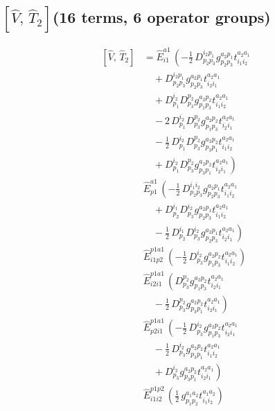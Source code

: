 \documentclass[11pt]{article}
\begin{document}
\subsection*{$\left[\hat{V},\, \hat{T}_{2}\right]$\quad(16 terms, 6 operator groups)}
\begin{align}
\left[\hat{V},\, \hat{T}_{2}\right] &= \hat{E}^{a1}_{i1}\,\left(- \tfrac{1}{2}\, D^{i_{2}p_{1}}_{p_{2}p_{3}} g^{a_{2}p_{1}}_{p_{2}p_{3}} t^{a_{2}a_{1}}_{i_{1}i_{2}} \right. \\
&\left.\quad + D^{i_{2}p_{1}}_{p_{2}p_{3}} g^{a_{2}p_{1}}_{p_{2}p_{3}} t^{a_{2}a_{1}}_{i_{2}i_{1}} \right. \\
&\left.\quad + D^{i_{2}}_{p_{1}} D^{p_{2}}_{p_{3}} g^{a_{2}p_{2}}_{p_{1}p_{3}} t^{a_{2}a_{1}}_{i_{1}i_{2}} \right. \\
&\left.\quad - 2\, D^{i_{2}}_{p_{1}} D^{p_{2}}_{p_{3}} g^{a_{2}p_{2}}_{p_{1}p_{3}} t^{a_{2}a_{1}}_{i_{2}i_{1}} \right. \\
&\left.\quad - \tfrac{1}{2}\, D^{i_{2}}_{p_{1}} D^{p_{2}}_{p_{3}} g^{a_{2}p_{2}}_{p_{3}p_{1}} t^{a_{2}a_{1}}_{i_{1}i_{2}} \right. \\
&\left.\quad + D^{i_{2}}_{p_{1}} D^{p_{2}}_{p_{3}} g^{a_{2}p_{2}}_{p_{3}p_{1}} t^{a_{2}a_{1}}_{i_{2}i_{1}} \right) \\
&\hat{E}^{a1}_{p1}\,\left(- \tfrac{1}{2}\, D^{i_{1}i_{2}}_{p_{2}p_{3}} g^{a_{2}p_{1}}_{p_{2}p_{3}} t^{a_{2}a_{1}}_{i_{1}i_{2}} \right. \\
&\left.\quad + D^{i_{1}}_{p_{2}} D^{i_{2}}_{p_{3}} g^{a_{2}p_{1}}_{p_{2}p_{3}} t^{a_{2}a_{1}}_{i_{1}i_{2}} \right. \\
&\left.\quad - \tfrac{1}{2}\, D^{i_{1}}_{p_{2}} D^{i_{2}}_{p_{3}} g^{a_{2}p_{1}}_{p_{2}p_{3}} t^{a_{2}a_{1}}_{i_{2}i_{1}} \right) \\
&\hat{E}^{p1a1}_{i1p2}\,\left(- \tfrac{1}{2}\, D^{i_{2}}_{p_{3}} g^{a_{2}p_{2}}_{p_{1}p_{3}} t^{a_{2}a_{1}}_{i_{1}i_{2}} \right) \\
&\hat{E}^{p1a1}_{i2i1}\,\left(D^{p_{2}}_{p_{3}} g^{a_{2}p_{2}}_{p_{1}p_{3}} t^{a_{2}a_{1}}_{i_{2}i_{1}} \right. \\
&\left.\quad - \tfrac{1}{2}\, D^{p_{2}}_{p_{3}} g^{a_{2}p_{2}}_{p_{3}p_{1}} t^{a_{2}a_{1}}_{i_{2}i_{1}} \right) \\
&\hat{E}^{p1a1}_{p2i1}\,\left(- \tfrac{1}{2}\, D^{i_{2}}_{p_{3}} g^{a_{2}p_{2}}_{p_{1}p_{3}} t^{a_{2}a_{1}}_{i_{2}i_{1}} \right. \\
&\left.\quad - \tfrac{1}{2}\, D^{i_{2}}_{p_{3}} g^{a_{2}p_{2}}_{p_{3}p_{1}} t^{a_{2}a_{1}}_{i_{1}i_{2}} \right. \\
&\left.\quad + D^{i_{2}}_{p_{3}} g^{a_{2}p_{2}}_{p_{3}p_{1}} t^{a_{2}a_{1}}_{i_{2}i_{1}} \right) \\
&\hat{E}^{p1p2}_{i1i2}\,\left(\tfrac{1}{2}\, g^{a_{1}a_{2}}_{p_{1}p_{2}} t^{a_{1}a_{2}}_{i_{1}i_{2}} \right)
\end{align}
\end{document}
